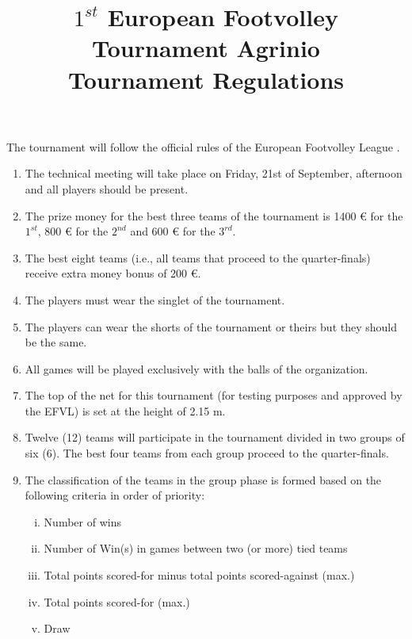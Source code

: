 \documentclass[a4paper,11pt]{article}
\title{$1^{st}$ European Footvolley Tournament Agrinio \\ Tournament Regulations}
\date{}
\begin{document}
\maketitle
\thispagestyle{fancy}

\vspace{-2cm}

The tournament will follow the official rules of the European Footvolley League
\cite{EFVL}.

\begin{enumerate}

\item The technical meeting will take place on Friday, 21st of September,
   afternoon and all players should be present.

\item The prize money for the best three teams of the tournament is 1400 € for
  the $1^{st}$, 800 € for the $2^{nd}$ and 600 € for the $3^{rd}$.

\item The best eight teams (i.e., all teams that proceed to the quarter-finals)
  receive extra money bonus of 200 €.

\item The players must wear the singlet of the tournament.

\item The players can wear the shorts of the tournament or theirs but they
  should be the same.

\item All games will be played exclusively with the balls of the organization.

\item The top of the net for this tournament (for testing purposes and approved
  by the EFVL) is set at the height of 2.15 m.

\item Twelve (12) teams will participate in the tournament divided in two groups
  of six (6). The best four teams from each group proceed to the quarter-finals.

\item The classification of the teams in the group phase is formed based on the
  following criteria in order of priority:

  \begin{enumerate}[i)]
  \item Number of wins
  \item Number of Win(s) in games between two (or more) tied teams
  \item Total points scored-for minus total points scored-against (max.)
  \item Total points scored-for (max.)
  \item Draw %
  \end{enumerate}


\end{enumerate}
\end{document}
